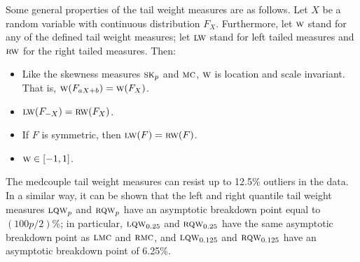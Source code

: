 Some general properties of the tail weight measures are as follows. 
Let $X$ be a random variable with continuous distribution $F_X$. Furthermore, 
let $\stsc{W}$ stand for any of the defined tail weight measures; 
let $\stsc{LW}$ stand for left tailed measures and $\stsc{RW}$ 
for the right tailed measures. Then:
\begin{itemize}
    \item Like the skewness measures $\stsc{SK}_p$ and $\stsc{MC}$,
    $\stsc{W}$ is location and scale invariant. That is, $\stsc{W}(F_{aX+b}) = \stsc{W}(F_X)$.

    \item $\stsc{LW}(F_{-X}) = \stsc{RW}(F_X)$.

    \item If $F$ is symmetric, then $\stsc{LW}(F) = \stsc{RW}(F)$.

    \item $\stsc{W} \in[-1,1]$.
\end{itemize}

The medcouple tail weight measures can resist up to 12.5\% outliers in the
data. In a similar way, it can be shown that the left and right quantile tail
weight measures $\stsc{LQW}_p$ and $\stsc{RQW}_p$ have an asymptotic
breakdown point equal to $(100p/2)\%$; in particular, $\stsc{LQW}_{0.25}$
and $\stsc{RQW}_{0.25}$ have the same asymptotic breakdown point as
$\stsc{LMC}$ and $\stsc{RMC}$, and $\stsc{LQW}_{0.125}$ and
$\stsc{RQW}_{0.125}$ have an asymptotic breakdown point of 6.25\%.


